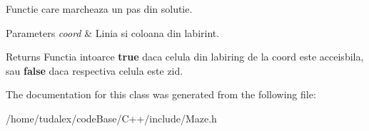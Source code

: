 Functie care marcheaza un pas din solutie. 


\begin{DoxyParams}{Parameters}
{\em coord} & Linia si coloana din labirint. \\
\hline
\end{DoxyParams}
\begin{DoxyReturn}{Returns}
Functia intoarce {\bfseries true} daca celula din labiring de la coord este acceisbila, sau {\bfseries false} daca respectiva celula este zid. 
\end{DoxyReturn}


The documentation for this class was generated from the following file:\begin{DoxyCompactItemize}
\item 
/home/tudalex/codeBase/C++/include/Maze.h\end{DoxyCompactItemize}
